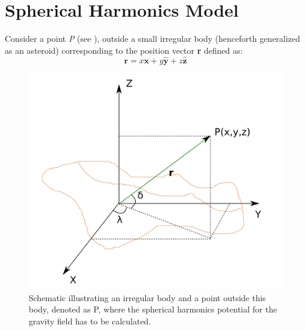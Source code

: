 \section{Spherical Harmonics Model}
\label{spherical_harmonics}
Consider a point \textit{P} (see ), outside a small irregular body (henceforth generalized as an asteroid) corresponding to the position vector \textbf{r} defined as:
\begin{equation}
\label{sph_pos}
\textbf{r} = x\mathbf{\hat{x}} + y\mathbf{\hat{y}} +z\mathbf{\hat{z}}
\end{equation}
%
\begin{figure}[htb]
\centering
\captionsetup{justification=centering}
\includegraphics[scale=0.5]{spherical_harmonics_starting_illustration.png}
\caption{Schematic illustrating an irregular body and a point outside this body, denoted as P, where the spherical harmonics potential for the gravity field has to be calculated.}
\label{fig:spher_harm_init_illustration}
\end{figure}

